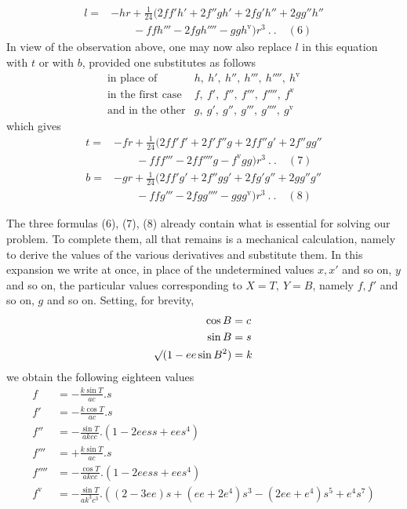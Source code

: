 %
\[
\begin{aligned}
l={}&-hr+\tfrac1{24}(2ff'h'+2f''gh'+2fg'h''+2gg''h''\\
&\qquad-ffh'''-2fgh''''-ggh^{\mathrm{v}})r^3\ .\ .\quad(6)
\end{aligned}
\]
In view of the observation above, one may now also replace \(l\) in this equation with \(t\) or with \(b\), provided one substitutes as follows
\[
\begin{array}{rl}
\text{in place of}&h,\ h',\ h'',\ h''',\ h'''',\ h^{\mathrm{v}}\\
\text{in the first case}&f,\ f',\ f'',\ f''',\ f'''',\ f^{\mathrm{v}}\\
\text{and in the other}&g,\ g',\ g'',\ g''',\ g'''',\ g^{\mathrm{v}}
\end{array}
\]
which gives
\[
\begin{aligned}
t={}&-fr+\tfrac1{24}(2ff'f'+2f'f''g+2ff''g'+2f''gg''\\
&\qquad-fff'''-2ff''''g-f^{\mathrm{v}}gg)r^3\ .\ .\quad(7)\\
b={}&-gr+\tfrac1{24}(2ff'g'+2f''gg'+2fg'g''+2gg''g''\\
&\qquad-ffg'''-2fgg''''-ggg^{\mathrm{v}})r^3\ .\ .\quad(8)
\end{aligned}
\]

The three formulas (6), (7), (8) already contain what is essential for solving our problem. To complete them, all that remains is a mechanical calculation, namely to derive the values of the various derivatives and substitute them. In this expansion we write at once, in place of the undetermined values \(x,x'\) and so on, \(y\) and so on, the particular values corresponding to \(X=T,\ Y=B\), namely \(f,f'\) and so on, \(g\) and so on. Setting, for brevity,
\[
\begin{aligned}
\cos B&=c\\
\sin B&=s\\
\mathord{{}^{}\!\surd}(1-ee\sin B^2)&=k
\end{aligned}
\]
we obtain the following eighteen values
\[
\begin{aligned}
f&=-\frac{k\sin T}{ac}\mathord{.}s\\
f'&=-\frac{k\cos T}{ac}\mathord{.}s\\
f''&=-\frac{\sin T}{akcc}\mathord{.}(1-2eess+ees^4)\\
f'''&=+\frac{k\sin T}{ac}\mathord{.}s\\
f''''&=-\frac{\cos T}{akcc}\mathord{.}(1-2eess+ees^4)\\
f^{\mathrm{v}}&=-\frac{\sin T}{ak^3c^3}\mathord{.}((2-3ee)s+(ee+2e^4)s^3-(2ee+e^4)s^5+e^4s^7)
\end{aligned}
\]
